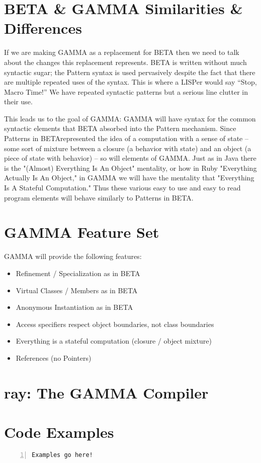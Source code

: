 \documentclass[10pt]{article}
\newcommand{\Lang}{GAMMA}
\newcommand{\Compiler}{ray}
\newcommand{\OLang}{BETA}
\begin{document}
\section*{\OLang{} \& \Lang{} Similarities \& Differences}
If we are making \Lang{} as a replacement for \OLang{} then we need to talk
about the changes this replacement represents. \OLang{} is written without
much syntactic sugar; the Pattern syntax is used pervasively despite the
fact that there are multiple repeated uses of the syntax. This is where a
LISPer would say ``Stop, Macro Time!'' We have repeated syntactic patterns
but a serious line clutter in their use.

This leads us to the goal of \Lang{}: \Lang{} will have syntax for the common
syntactic elements that \OLang{} absorbed into the Pattern mechanism. Since
Patterns in \OLang represented the idea of a computation with a sense of state
-- some sort of mixture between a closure (a behavior with state) and an object
(a piece of state with behavior) -- so will elements of \Lang{}. Just as in
Java there is the "(Almost) Everything Is An Object" mentality, or how in Ruby
"Everything Actually Is An Object," in \Lang{} we will have the mentality that
"Everything Is A Stateful Computation." Thus these various easy to use and
easy to read program elements will behave similarly to Patterns in \OLang{}.

\section*{\Lang{} Feature Set}

\Lang{} will provide the following features:

\begin{itemize}
\item Refinement / Specialization as in \OLang{}
\item Virtual Classes / Members as in \OLang{}
\item Anonymous Instantiation as in \OLang{}
\item Access specifiers respect object boundaries, not class boundaries
\item Everything is a stateful computation (closure / object mixture)
\item References (no Pointers)
\end{itemize}

\section*{\Compiler{}: The \Lang{} Compiler}

\section*{Code Examples}

\begin{lstlisting}[numbers=left,label=The All-mighty Pattern,caption=The All-mighty Pattern]
Examples go here!
\end{lstlisting}
\end{document}
